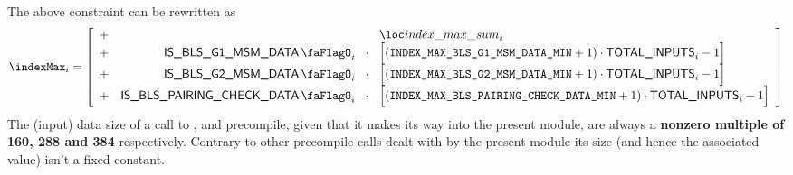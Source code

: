 The above constraint can be rewritten as
\[
	\indexMax_{i}
	=
	\left[ \begin{array}{crcl}
			+ &                              &                   & \locIndexMaxSum_{i}                                                          \\
            + & \isBlsGOneMsmData_       {i} & \!\!\!\cdot\!\!\! & \Big[ (\indexMaxBlsGOneMsmDataMin + 1) \cdot \totalInputs_{i} - 1 \Big]      \\
            + & \isBlsGTwoMsmData_       {i} & \!\!\!\cdot\!\!\! & \Big[ (\indexMaxBlsGTwoMsmDataMin + 1) \cdot \totalInputs_{i} - 1 \Big]      \\
			+ & \isBlsPairingCheckData_ {i}  & \!\!\!\cdot\!\!\! & \Big[ (\indexMaxBlsPairingCheckDataMin + 1) \cdot \totalInputs_{i} - 1 \Big] \\
		\end{array} \right]
\]
\saNote{} The (input) data size of a call to ,  and  precompile, given that it makes its way into the present module, are always a \textbf{nonzero multiple of 160, 288 and 384} respectively. Contrary to other precompile calls dealt with by the present module its size (and hence the associated \indexMax{} value) isn't a fixed constant.